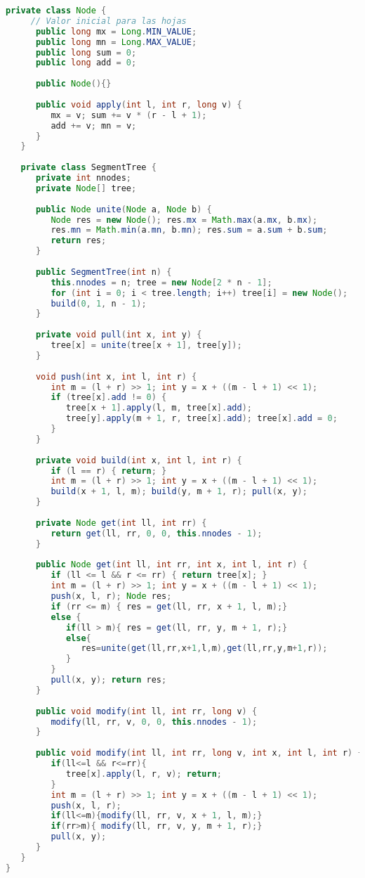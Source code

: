 \begin{lstlisting}[language=Java]
   private class Node { 
     // Valor inicial para las hojas
      public long mx = Long.MIN_VALUE;
      public long mn = Long.MAX_VALUE;
      public long sum = 0;
      public long add = 0;
		
      public Node(){}
     
      public void apply(int l, int r, long v) {
         mx = v; sum += v * (r - l + 1);
         add += v; mn = v;
      }
   }
	
   private class SegmentTree {
      private int nnodes;
      private Node[] tree;
		
      public Node unite(Node a, Node b) {
         Node res = new Node(); res.mx = Math.max(a.mx, b.mx);
         res.mn = Math.min(a.mn, b.mn); res.sum = a.sum + b.sum;
         return res;
      }
      
      public SegmentTree(int n) {
         this.nnodes = n; tree = new Node[2 * n - 1];
         for (int i = 0; i < tree.length; i++) tree[i] = new Node();
         build(0, 1, n - 1);
      }
		
      private void pull(int x, int y) {
         tree[x] = unite(tree[x + 1], tree[y]);
      }
		
      void push(int x, int l, int r) {
         int m = (l + r) >> 1; int y = x + ((m - l + 1) << 1);
         if (tree[x].add != 0) {
            tree[x + 1].apply(l, m, tree[x].add);
            tree[y].apply(m + 1, r, tree[x].add); tree[x].add = 0;
         }
      }
		
      private void build(int x, int l, int r) {
         if (l == r) { return; }
         int m = (l + r) >> 1; int y = x + ((m - l + 1) << 1);
         build(x + 1, l, m); build(y, m + 1, r); pull(x, y);
      }
		
      private Node get(int ll, int rr) {
         return get(ll, rr, 0, 0, this.nnodes - 1);
      }
		
      public Node get(int ll, int rr, int x, int l, int r) {
         if (ll <= l && r <= rr) { return tree[x]; }
         int m = (l + r) >> 1; int y = x + ((m - l + 1) << 1);
         push(x, l, r); Node res;
         if (rr <= m) { res = get(ll, rr, x + 1, l, m);} 
         else {
            if(ll > m){ res = get(ll, rr, y, m + 1, r);} 
            else{
               res=unite(get(ll,rr,x+1,l,m),get(ll,rr,y,m+1,r));
            }
         }
         pull(x, y); return res;
      }
      
      public void modify(int ll, int rr, long v) {
         modify(ll, rr, v, 0, 0, this.nnodes - 1);
      }
		
      public void modify(int ll, int rr, long v, int x, int l, int r) {
         if(ll<=l && r<=rr){
            tree[x].apply(l, r, v); return;
         }
         int m = (l + r) >> 1; int y = x + ((m - l + 1) << 1);
         push(x, l, r);
         if(ll<=m){modify(ll, rr, v, x + 1, l, m);}
         if(rr>m){ modify(ll, rr, v, y, m + 1, r);}
         pull(x, y);
      }
   }
}
\end{lstlisting}